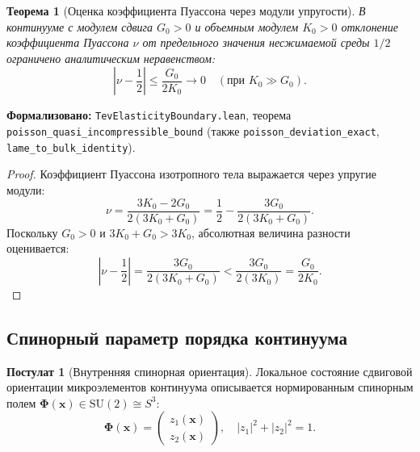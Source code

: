 \documentclass[11pt,a4paper]{article}
\newtheorem{theorem}{Теорема}
\theoremstyle{definition}
\newtheorem{postulate}{Постулат}
\theoremstyle{remark}
\begin{document}
\begin{theorem}[Оценка коэффициента Пуассона через модули упругости]
\label{thm:poisson_bound_exact}
В континууме с модулем сдвига $G_0 > 0$ и объемным модулем $K_0 > 0$ отклонение коэффициента Пуассона $\nu$ от предельного значения несжимаемой среды $1/2$ ограничено аналитическим неравенством:
\begin{equation}
	\left| \nu - \frac{1}{2} \right| \le \frac{G_0}{2 K_0} \to 0 \quad (\text{при } K_0 \gg G_0).
	\label{eq:poisson_bound_ineq}
\end{equation}
\end{theorem}

\noindent\small\textbf{Формализовано:} \texttt{TevElasticityBoundary.lean}, теорема \texttt{poisson_quasi_incompressible_bound} (также \texttt{poisson_deviation_exact}, \texttt{lame_to_bulk_identity}).

\begin{proof}
Коэффициент Пуассона изотропного тела выражается через упругие модули:
\begin{equation}
	\nu = \frac{3K_0 - 2G_0}{2(3K_0 + G_0)} = \frac{1}{2} - \frac{3G_0}{2(3K_0 + G_0)}.
\end{equation}
Поскольку $G_0 > 0$ и $3K_0 + G_0 > 3K_0$, абсолютная величина разности оценивается:
\begin{equation}
	\left| \nu - \frac{1}{2} \right| = \frac{3G_0}{2(3K_0 + G_0)} < \frac{3G_0}{2(3K_0)} = \frac{G_0}{2K_0}.
\end{equation}
\end{proof}
	
\subsection{Спинорный параметр порядка континуума}
	
\begin{postulate}[Внутренняя спинорная ориентация]
Локальное состояние сдвиговой ориентации микроэлементов континуума описывается нормированным спинорным полем $\boldsymbol{\Phi}(\mathbf{x}) \in \mathrm{SU}(2) \cong S^3$:
\begin{equation}
	\boldsymbol{\Phi}(\mathbf{x}) = \begin{pmatrix} z_1(\mathbf{x}) \\ z_2(\mathbf{x}) \end{pmatrix}, \quad |z_1|^2 + |z_2|^2 = 1.
	\label{eq:spinor_order_parameter}
\end{equation}
\end{postulate}
	
\end{document}
